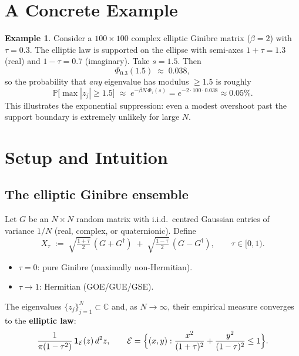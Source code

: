 \documentclass[11pt,a4paper]{article}
\theoremstyle{definition}
\newtheorem{example}[theorem]{Example}
\theoremstyle{remark}
\begin{document}
\section{A Concrete Example}

\begin{example}
Consider a $100\times 100$ complex elliptic Ginibre matrix ($\beta=2$) with $\tau=0.3$.  The elliptic law is supported on the ellipse with semi-axes $1+\tau=1.3$ (real) and $1-\tau=0.7$ (imaginary).  Take $s=1.5$.  Then
\[
\Phi_{0.3}(1.5)\;\approx\;0.038,
\]
so the probability that \emph{any} eigenvalue has modulus $\ge 1.5$ is roughly
\[
\mathbb{P}\bigl[\max|z_j|\ge 1.5\bigr]\;\approx\; e^{-\beta N\,\Phi_\tau(s)}=e^{-2\cdot 100\cdot 0.038}\approx 0.05\%.
\]
This illustrates the exponential suppression: even a modest overshoot past the support boundary is extremely unlikely for large $N$.
\end{example}

\section{Setup and Intuition}

\subsection*{The elliptic Ginibre ensemble}

Let $G$ be an $N\times N$ random matrix with i.i.d.\ centred Gaussian entries of variance $1/N$ (real, complex, or quaternionic).  Define
\[
X_\tau \;:=\; \sqrt{\tfrac{1+\tau}{2}}\,(G+G^\dagger)\;+\;\sqrt{\tfrac{1-\tau}{2}}\,(G-G^\dagger),
\qquad \tau\in[0,1).
\]
\begin{itemize}[nosep]
\item $\tau=0$: pure Ginibre (maximally non-Hermitian).
\item $\tau\to 1$: Hermitian (GOE/GUE/GSE).
\end{itemize}
The eigenvalues $\{z_j\}_{j=1}^N\subset\mathbb{C}$ and, as $N\to\infty$, their empirical measure converges to the \textbf{elliptic law}:
\[
\frac{1}{\pi(1-\tau^2)}\,\mathbf{1}_{\mathcal{E}}(z)\,d^2z,
\qquad
\mathcal{E}=\Bigl\{(x,y):\frac{x^2}{(1+\tau)^2}+\frac{y^2}{(1-\tau)^2}\le 1\Bigr\}.
\]
\end{document}
